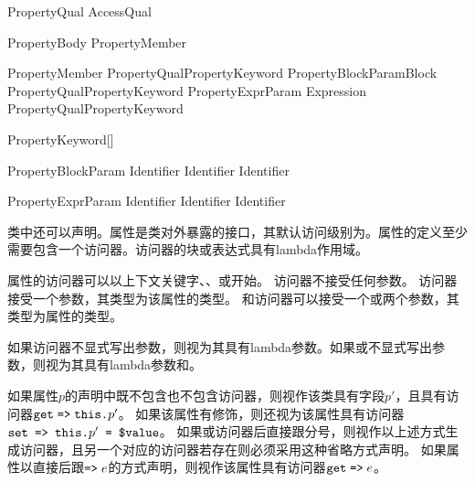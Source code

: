 \begin{bnf}{PropertyQual}
    AccessQual
\end{bnf}

\begin{bnf}{PropertyBody}
    \terminal{\{} PropertyMember\bnfp \terminal{\}}
\end{bnf}

\begin{bnf}{PropertyMember}
    PropertyQual\bnfs PropertyKeyword PropertyBlockParam\bnfq Block \br
    PropertyQual\bnfs PropertyKeyword PropertyExprParam\bnfq \terminal{=>} Expression \terminal{;} \br
    PropertyQual\bnfs PropertyKeyword \terminal{;}
\end{bnf}

\begin{bnf}{PropertyKeyword}[\oneof]
\end{bnf}

\begin{bnf}{PropertyBlockParam}
    Identifier \br
    Identifier \terminal{,} Identifier
\end{bnf}

\begin{bnf}{PropertyExprParam}
    Identifier \br
    \terminal{(} Identifier \terminal{,} Identifier \terminal{)}
\end{bnf}

\pnum
类中还可以声明。属性是类对外暴露的接口，其默认访问级别为。属性的定义至少需要包含一个访问器。访问器的块或表达式具有lambda作用域。

\pnum
属性的访问器可以以上下文关键字、、或开始。
访问器不接受任何参数。
访问器接受一个参数，其类型为该属性的类型。
和访问器可以接受一个或两个参数，其类型为属性的类型。

\pnum
如果访问器不显式写出参数，则视为其具有lambda参数。如果或不显式写出参数，则视为其具有lambda参数和。

\pnum
如果属性$p$的声明中既不包含也不包含访问器，则视作该类具有字段$p'$，且具有访问器$\texttt{get}\mathrel{\texttt{=>}}\texttt{this.}p'$。
如果该属性有修饰，则还视为该属性具有访问器$\texttt{set => this.}p'\texttt{ = \$value}$。
如果或访问器后直接跟分号，则视作以上述方式生成访问器，且另一个对应的访问器若存在则必须采用这种省略方式声明。
如果属性以直接后跟$\mathrel{\texttt{=>}}e$的方式声明，则视作该属性具有访问器$\texttt{get} \mathrel{\texttt{=>}} e$。

